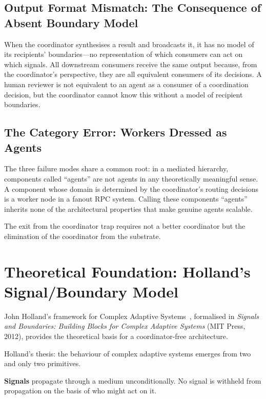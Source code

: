 \documentclass[11pt]{article}
\begin{document}
\subsection{Output Format Mismatch: The Consequence of Absent Boundary Model}

When the coordinator synthesises a result and broadcasts it, it has no model of
its recipients' boundaries---no representation of which consumers can act on which
signals. All downstream consumers receive the same output because, from the
coordinator's perspective, they are all equivalent consumers of its decisions. A
human reviewer is not equivalent to an agent as a consumer of a coordination
decision, but the coordinator cannot know this without a model of recipient
boundaries.

\subsection{The Category Error: Workers Dressed as Agents}

The three failure modes share a common root: in a mediated hierarchy, components
called ``agents'' are not agents in any theoretically meaningful sense. A component
whose domain is determined by the coordinator's routing decisions is a worker node
in a fanout RPC system. Calling these components ``agents'' inherits none of the
architectural properties that make genuine agents scalable.

The exit from the coordinator trap requires not a better coordinator but the
elimination of the coordinator from the substrate.

\section{Theoretical Foundation: Holland's Signal/Boundary Model}

John Holland's framework for Complex Adaptive Systems~\cite{holland,holland-intro},
formalised in \emph{Signals and Boundaries: Building Blocks for Complex Adaptive
Systems} (MIT Press, 2012), provides the theoretical basis for a coordinator-free
architecture.

Holland's thesis: the behaviour of complex adaptive systems emerges from two and
only two primitives.

\textbf{Signals} propagate through a medium unconditionally. No signal is withheld
from propagation on the basis of who might act on it.
\end{document}
